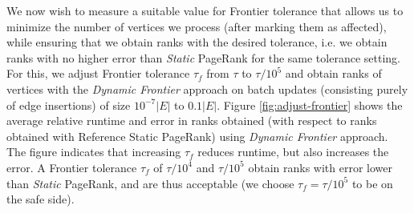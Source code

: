 We now wish to measure a suitable value for Frontier tolerance that allows us to minimize the number of vertices we process (after marking them as affected), while ensuring that we obtain ranks with the desired tolerance, i.e. we obtain ranks with no higher error than \textit{Static} PageRank for the same tolerance setting. For this, we adjust Frontier tolerance $\tau_f$ from $\tau$ to $\tau / 10^5$ and obtain ranks of vertices with the \textit{Dynamic Frontier} approach on batch updates (consisting purely of edge insertions) of size $10^{-7}|E|$ to $0.1|E|$. Figure \ref{fig:adjust-frontier} shows the average relative runtime and error in ranks obtained (with respect to ranks obtained with Reference Static PageRank) using \textit{Dynamic Frontier} approach. The figure indicates that increasing $\tau_f$ reduces runtime, but also increases the error. A Frontier tolerance $\tau_f$ of $\tau/10^4$ and $\tau/10^5$ obtain ranks with error lower than \textit{Static} PageRank, and are thus acceptable (we choose $\tau_f = \tau/10^5$ to be on the safe side).







